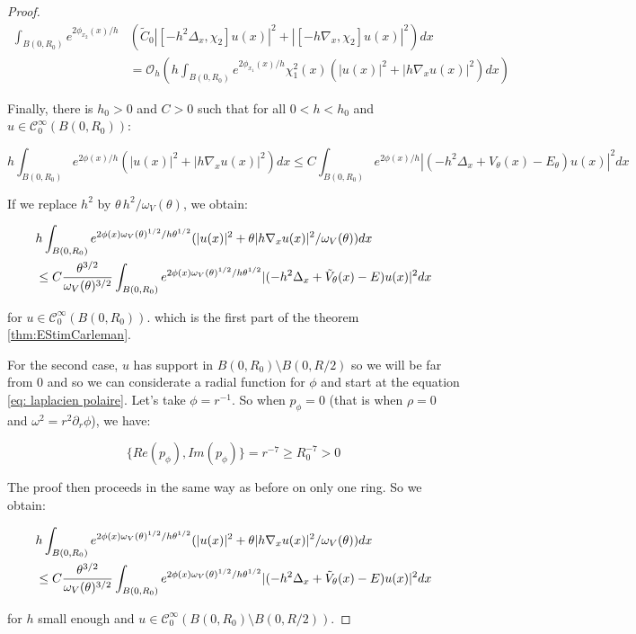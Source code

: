 \documentclass[leqno,11pt,letterpaper, english]{amsart}
\newcommand{\nn}{\nonumber}
\theoremstyle{plain}
\theoremstyle{definition}
\numberwithin{equation}{section}
\begin{document}
\begin{proof}
\begin{align}
\int_{B(0,R_0)} e^{2\phi_{x_2}(x)/h}  &(\tilde{C}_0|[-h^2\Delta_x, \chi_2]u(x)|^2 + |[-h\nabla_x, \chi_2]u(x)|^2)dx \nn\\
&=\mathcal{O}_h \left(h\int_{B(0,R_0)} e^{2\phi_{x_1}(x)/h} \chi_1^2(x) (|u(x)|^2 +|h\nabla_x u(x)|^2)dx \right)
\end{align}

Finally, there is $h_0>0$ and $C>0$ such that for all $0<h<h_0$ and $u\in \mathcal{C}_0^\infty(B(0,R_0))$:

\begin{equation}
    h\int_{B(0,R_0)} e^{2\phi(x)/h} (|u(x)|^2 +|h\nabla_x u(x)|^2)dx \leq C\int_{B(0,R_0)} e^{2\phi(x)/h}|(-h^2\Delta_x +V_{\theta}(x)- E_{\theta})u(x)|^2 dx
\end{equation}

If we replace $h^2$ by $\theta\, h^2 / \omega_V(\theta)$, we obtain:

\begin{align}
    &h\int_{B(0,R_0)} e^{2\phi(x)\omega_V(\theta)^{1/2}/h\theta^{1/2}} (|u(x)|^2 +\theta |h\nabla_x u(x)|^2/\omega_V(\theta))dx\nn\\
    &\leq C \frac{\theta^{3/2}}{\omega_V(\theta)^{3/2}}\int_{B(0,R_0)} e^{2\phi(x)\omega_V(\theta)^{1/2}/h\theta^{1/2}}|(-h^2\Delta_x +\Tilde{V}_{\theta}(x)- E)u(x)|^2 dx
\end{align}

for $u \in \mathcal{C}_0^\infty(B(0,R_0))$.
which is the first part of the theorem \ref{thm:EStimCarleman}.

For the second case, $u$ has support in $B(0,R_0)\setminus B(0,R/2)$ so we will be far from $0$ and so we can considerate a radial function for $\phi$ and start at the equation \ref{eq: laplacien polaire}. Let's take $\phi=r^{-1}$. So when $p_\phi=0$ (that is when $\rho=0$ and $\omega^2=r^2 \partial_r \phi$), we have:

\begin{equation}
	\{Re (p_\phi), Im (p_\phi) \}= r^{-7} \geq R_0^{-7}>0
\end{equation}

The proof then proceeds in the same way as before on only one ring. So we obtain:

\begin{align}
    &h\int_{B(0,R_0)} e^{2\phi(x)\omega_V(\theta)^{1/2}/h\theta^{1/2}} (|u(x)|^2 +\theta |h\nabla_x u(x)|^2/\omega_V(\theta))dx\nn\\
    &\leq C \frac{\theta^{3/2}}{\omega_V(\theta)^{3/2}}\int_{B(0,R_0)} e^{2\phi(x)\omega_V(\theta)^{1/2}/h\theta^{1/2}}|(-h^2\Delta_x +\Tilde{V}_{\theta}(x)- E)u(x)|^2 dx
\end{align}

for $h$ small enough and $u \in \mathcal{C}_0^\infty(B(0,R_0)\setminus B(0,R/2))$.

\end{proof}
\end{document}
